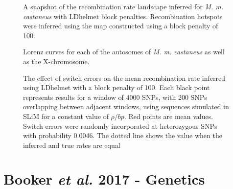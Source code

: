  \begin{figure}
   \centering      
   \noindent{}
 \caption[A snapshot of the recombination landscape for genomic region containing the PRDM9 gene]{A snapshot of the recombination rate landscape inferred for \textit{M. m. castaneus} with LDhelmet block penalties. Recombination hotspots were inferred using the map constructed using a block penalty of 100.}
 \label{fig:C2SF4}
\end{figure}
 
 
 \begin{figure}
   \centering      
   \noindent{}
 \caption[Lorenz curves for each of the chromosomes of \textit{M. m. castaneus}]{Lorenz curves for each of the autosomes of \textit{M. m. castaneus} as well as the X-chromosome.}
 \label{fig:C2SF5}
\end{figure}
 
 
 \begin{figure}
   \centering      
   \noindent{}
 \caption[The effect of switch errors on recombination rate inference]{The effect of switch errors on the mean recombination rate inferred using LDhelmet with a block penalty of 100. Each black point represents results for a window of 4000 SNPs, with 200 SNPs overlapping between adjacent windows, using sequences simulated in SLiM for a constant value of $\rho/bp$. Red points are mean values. Switch errors were randomly incorporated at heterozygous SNPs with probability 0.0046. The dotted line shows the value when the inferred and true rates are equal}
 \label{fig:C2SF6}
\end{figure}



\pagebreak
\section{Booker \emph{et al.} 2017 - Genetics}

\linespread{2}
